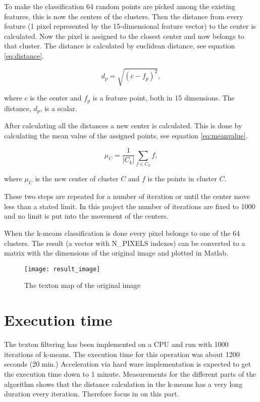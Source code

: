To make the classification 64 random points are picked among the existing features, this is now the centers of the clusters. 
Then the distance from every feature (1 pixel represented by the 15-dimensional feature vector) to the center is calculated. 
Now the pixel is assigned to the closest center and now belongs to that cluster. 
The distance is calculated by euclidean distance, see equation \ref{eq:distance}.

\begin{equation}
\label{eq:distance}
d_p = \sqrt{(c-f_p)^2},
\end{equation}

where $c$ is the center and $f_p$ is a feature point, both in 15 dimensions. The distance, $d_p$, is a scalar.

After calculating all the distances a new center is calculated. 
This is done by calculating the mean value of the assigned points, see equation \ref{eq:meanvalue}.

\begin{equation}
\label{eq:meanvalue}
\mu_C = \frac{1}{|C_k|}\sum_{f\in C_k}f,
\end{equation}

where $\mu_C$ is the new center of cluster $C$ and $f$ is the points in cluster $C$.

These two steps are repeated for a number of iteration or until the center move less than a stated limit. 
In this project the number of iterations are fixed to 1000 and no limit is put into the movement of the centers.

When the k-means classification is done every pixel belongs to one of the 64 clusters. 
The result (a vector with N\_PIXELS indexes) can be 
converted to a matrix with the dimensions of the 
original image and plotted in Matlab.

\begin{figure}[H]
\centering
\texttt{[image: result\_image]}
\caption{The texton map of the original image}
\label{fig:result}
\end{figure}



\section{Execution time}
The texton filtering has been implemented on a CPU and run with 1000 iterations of k-means. 
The execution time for this operation was about 1200 seconds (20 min.) 
Acceleration via hard ware implementation is expected to get the execution time down to 1 minute. 
Measurements for the different parts of the algorithm shows that the distance calculation in the k-means has a very long duration every iteration. 
Therefore focus in on this part.

